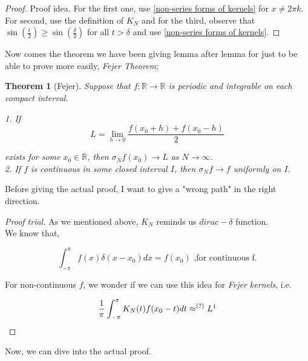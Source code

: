 \documentclass[12pt]{amsart}
\newtheorem{theorem}{Theorem}[section]
\theoremstyle{definition}
\begin{document}
\begin{proof}{Proof idea.}
    For the first one, use \ref{non-series forms of kernels} for $x \neq 2\pi k$. For second, use the definition of $K_N$ and for the third, observe that $\sin(\frac{t}{2}) \geq \sin(\frac{\delta}{2})$ for all $t > \delta$ and use \ref{non-series forms of kernels}.
\end{proof}


Now comes the theorem we have been giving lemma after lemma for just to be able to prove more easily, \textit{Fejer Theorem};


\begin{theorem}[Fejer]
    Suppose that $f: \mathbb{R} \to \mathbb{R}$ is periodic and integrable on each compact interval.


     


        1. If \begin{equation}
             L = \lim_{h \to 0} \frac{f(x_0 + h) + f(x_0 - h)}{2}
        \end{equation}

        exists for some $x_0 \in \mathbb{R}$, then $\sigma_Nf(x_0) \to L$ as $N \to \infty$.   \\
        2. If \(f\) is continuous in some closed interval $I$, then $\sigma_Nf \to f$ uniformly on $I$.

\end{theorem}


Before giving the actual proof, I want to give a "wrong path" in the right direction.


\begin{proof}[Proof trial]
    {As we mentioned above, $K_N$ reminds us $dirac-\delta$ function.}\\
   { We know that,}

   
    \[
    \int_{-\pi}^{\pi}f(x)\delta(x - x_0)dx = f(x_0) \text{  ,for continuous f.}
    \]

    
    For non-continuous \(f\), we wonder if we can use this idea for \textit{Fejer kernels}, i.e.

    
    \[
    \frac{1}{\pi}\int_{-\pi}^{\pi} K_N(t)f(x_0 - t)dt \approx^{(?)} L\footnotemark{}
    \]

    

    
\end{proof}


Now, we can dive into the actual proof.
\end{document}
